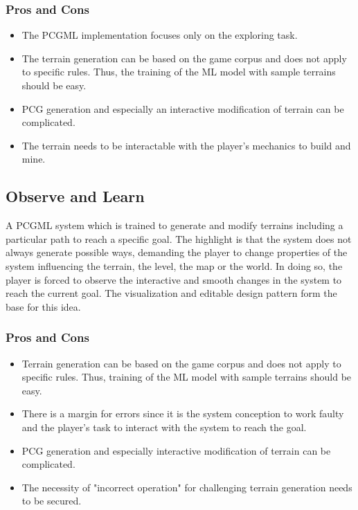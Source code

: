 \documentclass[MGS,Master,english]{twbook}%
\begin{document}
\subsubsection{Pros and Cons}
\begin{itemize}
	\item The PCGML implementation focuses only on the exploring task.
	\item The terrain generation can be based on the game corpus and does not apply to specific rules. Thus, the training of the ML model with sample terrains should be easy.
	\item PCG generation and especially an interactive modification of terrain can be complicated.
	\item The terrain needs to be interactable with the player's mechanics to build and mine.
\end{itemize}


\subsection{Observe and Learn} \label{idea::observeAndLearn}
A PCGML system which is trained to generate and modify terrains including a particular path to reach a specific goal. The highlight is that the system does not always generate possible ways, demanding the player to change properties of the system influencing the terrain, the level, the map or the world. In doing so, the player is forced to observe the interactive and smooth changes in the system to reach the current goal. The visualization and editable design pattern form the base for this idea.

\subsubsection{Pros and Cons}
\begin{itemize}
	\item Terrain generation can be based on the game corpus and does not apply to specific rules. Thus, training of the ML model with sample terrains should be easy.
	\item There is a margin for errors since it is the system conception to work faulty and the player's task to interact with the system to reach the goal. 
	\item PCG generation and especially interactive modification of terrain can be complicated.
	\item The necessity of "incorrect operation" for challenging terrain generation needs to be secured.
\end{itemize}
\end{document}
